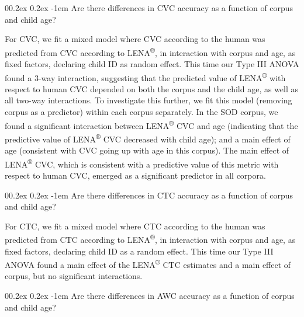 \documentclass[english,table,man,floatsintext]{apa6}
\makeatletter
\let\oldparagraph\paragraph
\renewcommand{\paragraph}[1]{\oldparagraph{#1}\mbox{}}
\renewcommand{\paragraph}{\@startsection{paragraph}{4}{\parindent}%
  {0\baselineskip \@plus 0.2ex \@minus 0.2ex}%
  {-1em}%
  {\normalfont\normalsize\bfseries\itshape\typesectitle}}
\makeatother
\begin{document}
\hypertarget{are-there-differences-in-cvc-accuracy-as-a-function-of-corpus-and-child-age}{%
\paragraph{Are there differences in CVC accuracy as a function of corpus and child age?}\label{are-there-differences-in-cvc-accuracy-as-a-function-of-corpus-and-child-age}}

For CVC, we fit a mixed model where CVC according to the human was predicted from CVC according to LENA\textsuperscript{®}, in interaction with corpus and age, as fixed factors, declaring child ID as random effect. This time our Type III ANOVA found a 3-way interaction, suggesting that the predicted value of LENA\textsuperscript{®} with respect to human CVC depended on both the corpus and the child age, as well as all two-way interactions. To investigate this further, we fit this model (removing corpus as a predictor) within each corpus separately. In the SOD corpus, we found a significant interaction between LENA\textsuperscript{®} CVC and age (indicating that the predictive value of LENA\textsuperscript{®} CVC decreased with child age); and a main effect of age (consistent with CVC going up with age in this corpus). The main effect of LENA\textsuperscript{®} CVC, which is consistent with a predictive value of this metric with respect to human CVC, emerged as a significant predictor in all corpora.

\hypertarget{are-there-differences-in-ctc-accuracy-as-a-function-of-corpus-and-child-age}{%
\paragraph{Are there differences in CTC accuracy as a function of corpus and child age?}\label{are-there-differences-in-ctc-accuracy-as-a-function-of-corpus-and-child-age}}

For CTC, we fit a mixed model where CTC according to the human was predicted from CTC according to LENA\textsuperscript{®}, in interaction with corpus and age, as fixed factors, declaring child ID as a random effect. This time our Type III ANOVA found a main effect of the LENA\textsuperscript{®} CTC estimates and a main effect of corpus, but no significant interactions.

\hypertarget{are-there-differences-in-awc-accuracy-as-a-function-of-corpus-and-child-age}{%
\paragraph{Are there differences in AWC accuracy as a function of corpus and child age?}\label{are-there-differences-in-awc-accuracy-as-a-function-of-corpus-and-child-age}}
\end{document}

